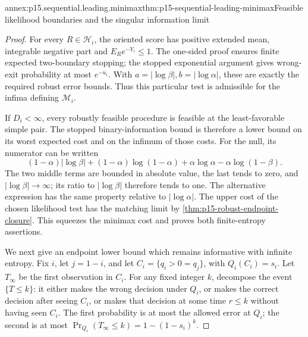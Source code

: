 \begin{annexitem}{annex:p15.sequential.leading.minimax}{thm:p15-sequential-leading-minimax}{Feasible likelihood boundaries and the singular information limit}
\begin{proof}
For every \(R\in\mathcal H_i\), the oriented score has positive
extended mean, integrable negative part and \(E_Re^{-Y_i}\leq1\).
The one-sided proof ensures finite expected two-boundary stopping;
the stopped exponential argument gives wrong-exit probability at most
\(e^{-u_i}\). With \(a=|\log\beta|,b=|\log\alpha|\), these are exactly
the required robust error bounds. Thus this particular test is
admissible for the infima defining \(\mathcal M_i\).

If \(D_i<\infty\), every robustly feasible procedure is feasible at
the least-favorable simple pair. The stopped binary-information
bound is therefore a lower bound on its worst expected cost and
on the infimum of those costs.
For the null, its numerator can be written
\[
 (1-\alpha)|\log\beta|+
 (1-\alpha)\log(1-\alpha)+\alpha\log\alpha
                  -\alpha\log(1-\beta).
\]
The two middle terms are bounded in absolute value, the last tends
to zero, and \(|\log\beta|\to\infty\); its ratio to
\(|\log\beta|\) therefore tends to one.
The alternative expression has the same property relative to
\(|\log\alpha|\).
The upper cost of the chosen likelihood test has the matching limit
by \cref{thm:p15-robust-endpoint-closure}. This squeezes the minimax
cost and proves both finite-entropy assertions.

We next give an endpoint lower bound which remains informative with
infinite entropy. Fix \(i\), let \(j=1-i\), and let
\(C_i=\{q_i>0=q_j\}\), with \(Q_i(C_i)=s_i\).
Let \(T_\infty\) be the first observation in \(C_i\).
For any fixed integer \(k\), decompose the event \(\{T\leq k\}\):
it either makes the wrong decision under \(Q_i\), or makes the correct
decision after seeing \(C_i\), or makes that decision at some
time \(r\leq k\) without having seen \(C_i\).
The first probability is at most the allowed error at \(Q_i\);
the second is at most
\(\Pr_{Q_i}(T_\infty\leq k)=1-(1-s_i)^k\).


\end{proof}
\end{annexitem}
